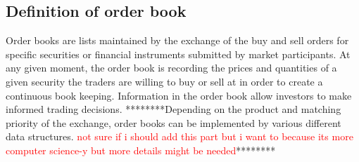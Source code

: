 \documentclass{article}
\newcommand{\todo}{\textcolor{red}}
\begin{document}
\subsection{Definition of order book} 
Order books are lists maintained by the exchange of the buy and sell orders for specific securities or financial instruments submitted by market participants. At any given moment, the order book is recording the prices and quantities of a given security the traders are willing to buy or sell at in order to create a continuous book keeping. Information in the order book allow investors to make informed trading decisions. ********Depending on the product and matching priority of the exchange, order books can be implemented by various different data structures. \todo{not sure if i should add this part but i want to because its more computer science-y but more details might be needed}******** 
\end{document}
